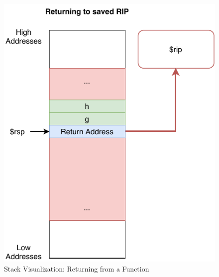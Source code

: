 \begin{figure}[htp!]
    \centering
    \includegraphics[width=\textwidth]{assets/figures/return.pdf}
    \caption{Stack Visualization: Returning from a Function}
    \label{fig:return-stack}
\end{figure}
